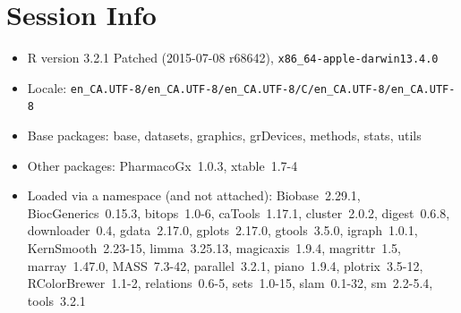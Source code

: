 \documentclass[11pt]{article}
\begin{document}
\section{Session Info}

\begin{itemize}\raggedright
  \item R version 3.2.1 Patched (2015-07-08 r68642), \verb|x86_64-apple-darwin13.4.0|
  \item Locale: \verb|en_CA.UTF-8/en_CA.UTF-8/en_CA.UTF-8/C/en_CA.UTF-8/en_CA.UTF-8|
  \item Base packages: base, datasets, graphics, grDevices, methods,
    stats, utils
  \item Other packages: PharmacoGx~1.0.3, xtable~1.7-4
  \item Loaded via a namespace (and not attached): Biobase~2.29.1,
    BiocGenerics~0.15.3, bitops~1.0-6, caTools~1.17.1, cluster~2.0.2,
    digest~0.6.8, downloader~0.4, gdata~2.17.0, gplots~2.17.0,
    gtools~3.5.0, igraph~1.0.1, KernSmooth~2.23-15, limma~3.25.13,
    magicaxis~1.9.4, magrittr~1.5, marray~1.47.0, MASS~7.3-42,
    parallel~3.2.1, piano~1.9.4, plotrix~3.5-12, RColorBrewer~1.1-2,
    relations~0.6-5, sets~1.0-15, slam~0.1-32, sm~2.2-5.4, tools~3.2.1
\end{itemize}


\end{document}

